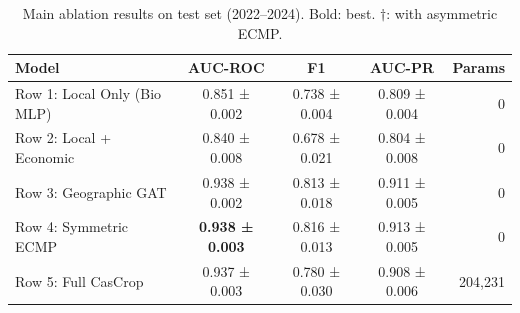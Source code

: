 \begin{table}[t]
\centering
\caption{Main ablation results on test set (2022--2024). Bold: best. $\dagger$: with asymmetric ECMP.}
\label{tab:ablation}
\begin{tabular}{lcccr}
\toprule
Model & AUC-ROC & F1 & AUC-PR & Params \\
\midrule
  Row 1: Local Only (Bio MLP) & 0.851 ± 0.002 & 0.738 ± 0.004 & 0.809 ± 0.004 & 0 \\
  Row 2: Local + Economic & 0.840 ± 0.008 & 0.678 ± 0.021 & 0.804 ± 0.008 & 0 \\
  Row 3: Geographic GAT & 0.938 ± 0.002 & 0.813 ± 0.018 & 0.911 ± 0.005 & 0 \\
  Row 4: Symmetric ECMP & \textbf{0.938 ± 0.003} & 0.816 ± 0.013 & 0.913 ± 0.005 & 0 \\
  Row 5: Full CasCrop & 0.937 ± 0.003 & 0.780 ± 0.030 & 0.908 ± 0.006 & 204,231 \\
\bottomrule
\end{tabular}
\end{table}